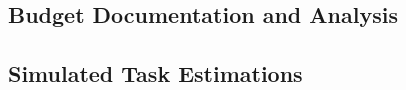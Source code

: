 %
%

\newpage
\begin{appendices}
\section{Budget Documentation and Analysis}
\label{appendix:budget}

\subsection{Simulated Task Estimations}


\end{appendices}
